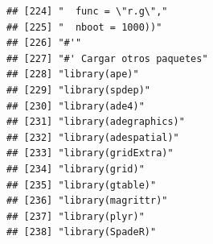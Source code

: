 \documentclass[11pt,]{article}
\begin{document}
\begin{verbatim}
## [224] "  func = \"r.g\","                                                                                                                                                     
## [225] "  nboot = 1000))"                                                                                                                                                      
## [226] "#'"                                                                                                                                                                    
## [227] "#' Cargar otros paquetes"                                                                                                                                              
## [228] "library(ape)"                                                                                                                                                          
## [229] "library(spdep)"                                                                                                                                                        
## [230] "library(ade4)"                                                                                                                                                         
## [231] "library(adegraphics)"                                                                                                                                                  
## [232] "library(adespatial)"                                                                                                                                                   
## [233] "library(gridExtra)"                                                                                                                                                    
## [234] "library(grid)"                                                                                                                                                         
## [235] "library(gtable)"                                                                                                                                                       
## [236] "library(magrittr)"                                                                                                                                                     
## [237] "library(plyr)"                                                                                                                                                         
## [238] "library(SpadeR)"                                                                                                                                                       

\end{verbatim}
\end{document}
